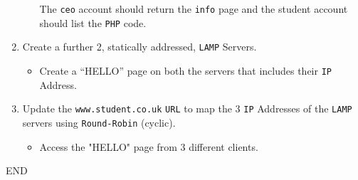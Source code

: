 \documentclass[11pt]{article}
\begin{document}
\begin{enumerate}
\begin{itemize}
\begin{tcolorbox}[title={\textbf{NOTE:}}]
                    \noindent The \texttt{ceo} account should return the \texttt{info} page and the student account should list the \texttt{PHP} code.
                \end{tcolorbox}
            \end{itemize}
    \item Create a further 2, statically addressed, \texttt{LAMP} Servers.
        \begin{itemize}
            \item Create a ``HELLO'' page on both the servers that includes their \texttt{IP} Address.
        \end{itemize}
    \item Update the \texttt{www.student.co.uk} \texttt{URL} to map the 3 \texttt{IP} Addresses of the \texttt{LAMP} servers using \texttt{Round-Robin} (cyclic).
        \begin{itemize}
            \item Access the "HELLO" page from 3 different clients.
        \end{itemize}
\end{enumerate}    
END
\end{document}
